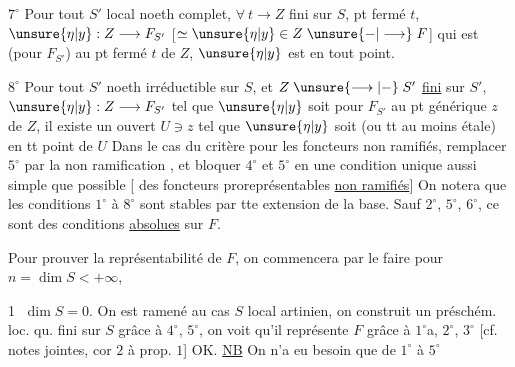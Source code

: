 $7^\circ$ Pour tout $S'$ local noeth complet,  $\forall\ t\longrightarrow Z$  fini sur $S$, pt fermé $t$, 
 $\unsure{\eta|y}:Z\longrightarrow F_{S'}$ [$\simeq\unsure{\eta|y}\in Z\mathrel{\unsure{-|\longrightarrow}}F$]
qui est  (pour $F_{S'}$) au pt fermé $t$ de $Z$, $\unsure{\eta|y}$ est   en tout point.

$8^\circ$ Pour tout $S'$ noeth irréductible sur $S$, et $Z\mathrel{\unsure{\longrightarrow|-}}S'$  \uline{fini} sur $S'$, $\unsure{\eta|y}:Z\longrightarrow F_{S'}$ tel que $\unsure{\eta|y}$ soit  pour $F_{S'}$ au pt générique $z$ de $Z$, il existe un ouvert $U\ni z$ tel que $\unsure{\eta|y}$ soit  (ou tt au moins étale) en tt point de $U$
Dans le cas du critère pour les foncteurs non ramifiés, remplacer $5^\circ$ par la non ramification , et bloquer $4^\circ$ et $5^\circ$ en une condition unique aussi simple que possible [ des foncteurs proreprésentables \uline{non ramifiés}]
On notera que les conditions $1^\circ$ à $8^\circ$ sont stables par tte extension de la base. Sauf $2^\circ$, $5^\circ$, $6^\circ$, ce sont des conditions \uline{absolues} sur $F$.

Pour prouver la représentabilité de $F$, on commencera par le faire pour $n=\dim S<+\infty$, 

\textcircled{1} $\dim S=0$. On est ramené au cas $S$ local artinien, on construit un préschém. loc. qu. fini sur $S$ grâce à \textcircled{$4^\circ$}, \textcircled{$5^\circ$}, on voit qu'il représente $F$ grâce à \textcircled{$1^\circ$}a, \textcircled{$2^\circ$}, \textcircled{$3^\circ$} [cf. notes jointes, cor $2$ à prop. $1$] OK. \uline{NB} On n'a eu besoin que de $1^\circ$ à $5^\circ$

